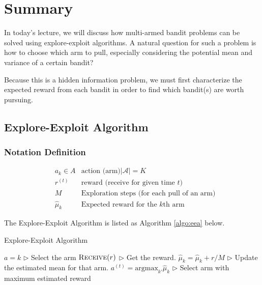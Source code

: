\documentclass[11pt]{article}
\begin{document}

\section{Summary}

In today's lecture, we will discuss how multi-armed bandit problems can be solved using explore-exploit algorithms. A natural question for such a problem is how to choose which arm to pull, especially considering the potential mean and variance of a certain bandit?

Because this is a hidden information problem, we must first characterize the expected reward from each bandit in order to find which bandit(s) are worth pursuing.

\subsection{Explore-Exploit Algorithm}
\subsubsection{Notation Definition}

\begin{align*}
    &a_k \in A & \text{action (arm)} |\mathcal{A}| = K \\
    & r^{(t)} & \text{reward (receive for given time $t$)} \\
    & M & \text{Exploration steps (for each pull of an arm)} \\
    & \hat{\mu}_k & \text{Expected reward for the $k$th arm} 
\end{align*}


\normalfont
The Explore-Exploit Algorithm \cite{LAI19854} is listed as Algorithm \ref{algo:eea} below.

\begin{algorithm}[H]
\caption{Explore-Exploit Algorithm}
\label{algo:eea}
\begin{algorithmic}[1]
        \STATE $a = k$ \hfill $\triangleright$ Select the arm
        \STATE $\textsc{Receive}(r)$ \hfill $\triangleright$ Get the reward.
        \STATE $\hat{\mu}_k = \hat{\mu}_k + r / M$ \hfill $\triangleright$ Update the estimated mean for that arm.
    \ENDFOR
        \STATE $a^{(t)} = \text{argmax}_{k'} \hat{\mu}_k$ \hfill $\triangleright$ Select arm with maximum estimated reward
    \ENDFOR
\ENDFOR
\end{algorithmic}
\end{algorithm}
\end{document}
